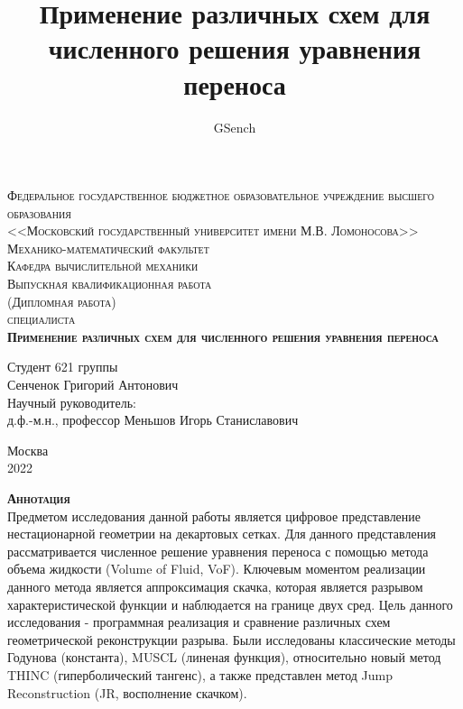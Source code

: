 \documentclass[12pt,a4paper]{article}
\author{GSench}
\title{Применение различных схем для численного решения уравнения переноса}
\begin{document}
\begin{titlepage}

\begin{center}
\textsc{Федеральное государственное бюджетное образовательное учреждение высшего образования\\
<<Московский государственный университет имени М.В. Ломоносова>>}\\
\vspace{12pt}
\textsc{Механико-математический факультет}\\
\textsc{Кафедра вычислительной механики}\\

\vspace*{\fill}
\textsc{Выпускная квалификационная работа\\
(Дипломная работа)\\
специалиста}\\
\vspace{12pt}
\textsc{\textbf{Применение различных схем для численного решения уравнения переноса}}\\
\vspace*{\fill}

\end{center}

\begin{flushright}
Студент 621 группы \\
Сенченок Григорий Антонович\\
\vspace{10pt}
Научный руководитель: \\
д.ф.-м.н., профессор Меньшов Игорь Станиславович
\end{flushright}

\mbox{}
\vfill
\begin{center}
Москва\\[5pt]
2022
\end{center}

\end{titlepage}

\newpage
\textsc{\textbf{Аннотация}}\\
Предметом исследования данной работы является цифровое представление нестационарной геометрии на декартовых сетках.
Для данного представления рассматривается численное решение уравнения переноса с помощью метода объема жидкости (Volume of Fluid, VoF). Ключевым моментом реализации данного метода является аппроксимация скачка, которая является разрывом характеристической функции и наблюдается на границе двух сред.
Цель данного исследования - программная реализация и сравнение различных схем геометрической реконструкции разрыва. Были исследованы классические методы Годунова (константа), MUSCL (линеная функция), относительно новый метод THINC (гиперболический тангенс), а также представлен метод Jump Reconstruction (JR, восполнение скачком).
\end{document}
